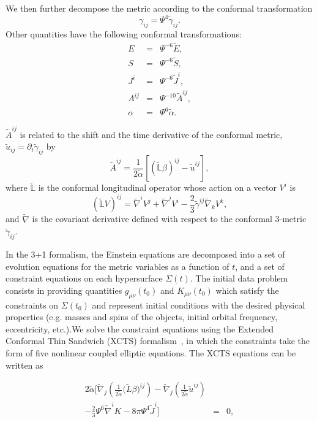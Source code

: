 {We then further decompose the metric according to the conformal
transformation
\begin{equation}
\gamma_{ij} = \Psi^4\tilde{\gamma}_{ij}.
\end{equation}
Other quantities have the following conformal
transformations:
\begin{eqnarray}
E &=& \Psi^{-6}\tilde{E}, \\ S &=& \Psi^{-6}\tilde{S}, \\ J^{i} &=&
\Psi^{-6}\tilde{J}^i, \\ A^{ij} &=& \Psi^{-10}\tilde{A}^{ij},\\ \alpha
&=& \Psi^{6}\tilde{\alpha}.
\end{eqnarray}

$\tilde{A}^{ij}$ is related to the shift and the time derivative of the conformal
metric, $\tilde{u}_{ij}=\partial_t\tilde{\gamma}_{ij}$ by
\begin{equation}
\tilde{A}^{ij} =
\frac{1}{2\tilde{\alpha}}\left[\left(\tilde{\mathbb{L}}\beta\right)^{ij}-\tilde{u}^{ij}\right],
\end{equation}
where $\tilde{\mathbb{L}}$ is the conformal longitudinal operator whose action on a vector $V^i$ is
\begin{equation}
\left(\tilde{\mathbb{L}}V\right)^{ij} = \tilde{\nabla}^iV^j +
\tilde{\nabla}^jV^i -
\frac{2}{3}\tilde{\gamma}^{ij}\tilde{\nabla}_kV^k,
\end{equation}
and $\tilde{\nabla}$ is the covariant derivative defined with respect to 
the conformal 3-metric $\tilde \gamma_{ij}$.

In the 3+1 formalism, the Einstein equations are decomposed into a set
of evolution equations for the metric variables as a function of $t$,
and a set of constraint equations on each hypersurface
$\Sigma(t)$. The initial data problem consists in providing quantities
$g_{\mu \nu}(t_0)$ and $K_{\mu \nu}(t_0)$ which satisfy the
constraints on $\Sigma(t_0)$ and represent initial conditions with the
desired physical properties (e.g. masses and spins of the objects,
initial orbital frequency, eccentricity, etc.).We solve the constraint
equations using the Extended Conformal Thin Sandwich (XCTS)
formalism~\cite{York1999}, in which the constraints take the form of
five nonlinear coupled elliptic equations.  The XCTS equations can be
written as

\begin{eqnarray}
2\tilde{\alpha}\bigg[\tilde{\nabla}_j\left(\frac{1}{2\tilde{\alpha}}\big(\tilde{L}\beta\big)^{ij}\right)-\tilde{\nabla}_j\left(\frac{1}{2\tilde{\alpha}}\tilde{u}^{ij}\right) && \nonumber\\
\label{eq:XCTS-Shift}
-\frac{2}{3}\Psi^6\tilde{\nabla}^iK-8\pi\Psi^4\tilde{J}^i\bigg] &=&0,
\end{eqnarray}

}

